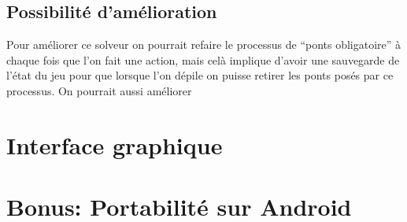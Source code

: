 \documentclass[12pt]{report}
\begin{document}
\section{Possibilité d'amélioration}
Pour améliorer ce solveur on pourrait refaire le processus de ``ponts obligatoire'' à chaque fois que l'on fait une action, mais celà implique d'avoir une sauvegarde de l'état du jeu pour que lorsque l'on dépile on puisse retirer les ponts posés par ce processus. On pourrait aussi améliorer 

\newpage
\chapter{Interface graphique}
\newpage
\chapter{Bonus: Portabilité sur Android}
\newpage
\end{document}
